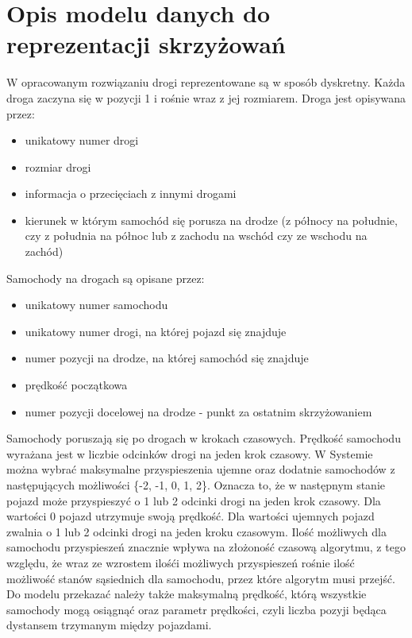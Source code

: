  \label{chap:implementation}

\section{Opis modelu danych do reprezentacji skrzyżowań}

W opracowanym rozwiązaniu drogi reprezentowane są w sposób dyskretny. Każda droga zaczyna się w pozycji 1 i rośnie wraz z jej rozmiarem. Droga jest opisywana przez:
\begin{itemize}
\item unikatowy numer drogi
\item rozmiar drogi
\item informacja o przecięciach z innymi drogami
\item kierunek w którym samochód się porusza na drodze (z północy na południe, czy z południa na północ lub z zachodu na wschód czy ze wschodu na zachód)
\end{itemize}
Samochody na drogach są opisane przez:
\begin{itemize}
\item unikatowy numer samochodu
\item unikatowy numer drogi, na której pojazd się znajduje
\item numer pozycji na drodze, na której samochód się znajduje
\item prędkość początkowa
\item numer pozycji docelowej na drodze - punkt za ostatnim skrzyżowaniem
\end{itemize}
Samochody poruszają się po drogach w krokach czasowych. Prędkość samochodu wyrażana jest w liczbie odcinków drogi na jeden krok czasowy.
\newline
\indent
W Systemie można wybrać maksymalne przyspieszenia ujemne oraz dodatnie samochodów z następujących możliwości \{-2, -1, 0, 1, 2\}. Oznacza to, że w następnym stanie pojazd może przyspieszyć o 1 lub 2 odcinki drogi na jeden krok czasowy. Dla wartości 0 pojazd utrzymuje swoją prędkość. Dla wartości ujemnych pojazd zwalnia o 1 lub 2 odcinki drogi na jeden kroku czasowym. Ilość możliwych dla samochodu przyspieszeń znacznie wpływa na złożoność czasową algorytmu, z tego względu, że wraz ze wzrostem ilośći możliwych przyspieszeń rośnie ilość możliwość stanów sąsiednich dla samochodu, przez które algorytm musi przejść.        
\newline
\indent
Do modelu przekazać należy także maksymalną prędkość, którą wszystkie samochody mogą osiągnąć oraz parametr prędkości, czyli liczba pozyji będąca dystansem trzymanym między pojazdami.

